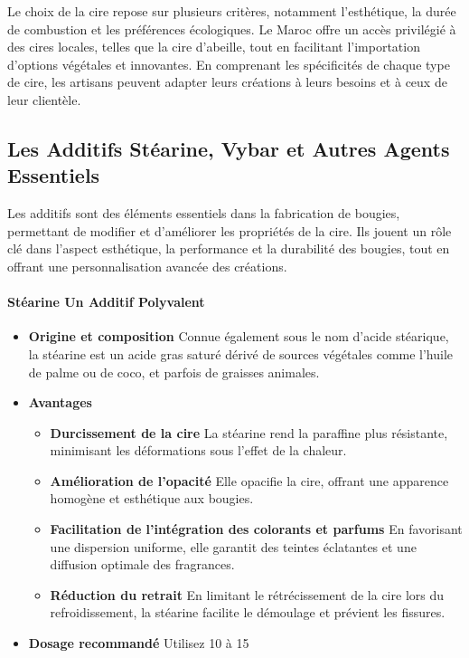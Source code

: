 \documentclass[11pt,fleqn,onecolumn,oneside]{book}
\begin{document}
\begin{corollary}
Le choix de la cire repose sur plusieurs critères, notamment l’esthétique, la durée de combustion et les préférences écologiques. Le Maroc offre un accès privilégié à des cires locales, telles que la cire d’abeille, tout en facilitant l’importation d’options végétales et innovantes. En comprenant les spécificités de chaque type de cire, les artisans peuvent adapter leurs créations à leurs besoins et à ceux de leur clientèle.
\end{corollary}


\subsection*{Les Additifs Stéarine, Vybar et Autres Agents Essentiels}

\begin{definition}
Les additifs sont des éléments essentiels dans la fabrication de bougies, permettant de modifier et d’améliorer les propriétés de la cire. Ils jouent un rôle clé dans l’aspect esthétique, la performance et la durabilité des bougies, tout en offrant une personnalisation avancée des créations.
\end{definition}

\paragraph{Stéarine Un Additif Polyvalent}

\begin{itemize}
    \item \textbf{Origine et composition} Connue également sous le nom d’acide stéarique, la stéarine est un acide gras saturé dérivé de sources végétales comme l’huile de palme ou de coco, et parfois de graisses animales.
    \item \textbf{Avantages}
        \begin{itemize}
            \item \textbf{Durcissement de la cire} La stéarine rend la paraffine plus résistante, minimisant les déformations sous l’effet de la chaleur.
            \item \textbf{Amélioration de l’opacité} Elle opacifie la cire, offrant une apparence homogène et esthétique aux bougies.
            \item \textbf{Facilitation de l’intégration des colorants et parfums} En favorisant une dispersion uniforme, elle garantit des teintes éclatantes et une diffusion optimale des fragrances.
            \item \textbf{Réduction du retrait} En limitant le rétrécissement de la cire lors du refroidissement, la stéarine facilite le démoulage et prévient les fissures.
        \end{itemize}
    \item \textbf{Dosage recommandé} Utilisez 10 à 15 %
\end{itemize}
\end{document}
